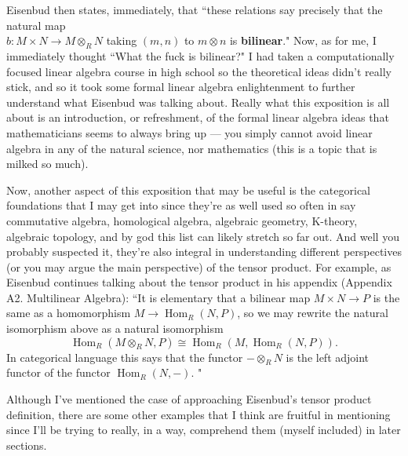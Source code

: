 \documentclass[12pt,reqno]{amsart}
\theoremstyle{plain}
\DeclareMathOperator{\Hom}{Hom}
\begin{document}
Eisenbud then states, immediately, that ``these relations say precisely that the natural map 
\\ $b \colon M \times N \to M \otimes_R N$ taking $(m, n)$ to $m \otimes n$ is \textbf{bilinear}." Now, as for me, I immediately thought ``What the fuck is bilinear?" I had taken a computationally focused linear algebra course in high school so the theoretical ideas didn't really stick, and so it took some formal linear algebra enlightenment to further understand what Eisenbud was talking about. Really what this exposition is all about is an introduction, or refreshment, of the formal linear algebra ideas that mathematicians seems to always bring up — you simply cannot avoid linear algebra in any of the natural science, nor mathematics (this is a topic that is milked so much).  

Now, another aspect of this exposition that may be useful is the categorical foundations that I may get into since they're as well used so often in say commutative algebra, homological algebra, algebraic geometry, K-theory, algebraic topology, and by god this list can likely stretch so far out. And well you probably suspected it, they're also integral in understanding different perspectives (or you may argue the main perspective) of the tensor product. For example, as Eisenbud continues talking about the tensor product in his appendix (Appendix A2. Multilinear Algebra): ``It is elementary that a bilinear map $M \times N \to P$ is the same as a homomorphism $M \to \Hom_R (N, P)$, so we may rewrite the natural isomorphism above as a natural isomorphism 
$$ \Hom_R (M \otimes_R N, P) \cong \Hom_R (M, \Hom_R (N, P)).$$
In categorical language this says that the functor $- \otimes_R N$ is the left adjoint functor of the functor $\Hom_R (N,  -)$. "

Although I've mentioned the case of approaching Eisenbud's tensor product definition, there are some other examples that I think are fruitful in mentioning since I'll be trying to really, in a way, comprehend them (myself included) in later sections. 
\end{document}
